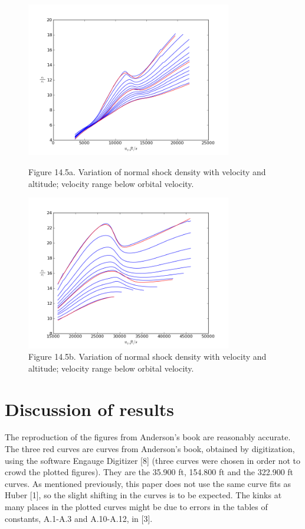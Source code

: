 \documentclass[9pt]{article}
\begin{document}
\begin{figure}[!htbp]
\includegraphics[width=0.80\textwidth]{145a}
\caption{Figure 14.5a. Variation of normal shock density with velocity and altitude; velocity range below orbital velocity.}
\includegraphics[width=0.80\textwidth]{145b}
\caption{Figure 14.5b. Variation of normal shock density with velocity and altitude; velocity range below orbital velocity.}
\end{figure}

\newpage
\section*{Discussion of results}
The reproduction of the figures from Anderson's book are reasonably accurate. The three red curves are curves from Anderson's book, obtained by digitization, using the software Engauge Digitizer [8] (three curves were chosen in order not to crowd the plotted figures). They are the 35.900 ft, 154.800 ft and the 322.900 ft curves. As mentioned previously, this paper does not use the same curve fits as Huber [1], so the slight shifting in the curves is to be expected. The kinks at many places in the plotted curves might be due to errors in the tables of constants, A.1-A.3 and A.10-A.12, in [3].
\end{document}
